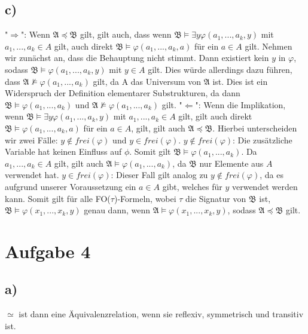 \documentclass[11pt, a4paper]{article}
\begin{document}
\subsection*{c)}
"$\Rightarrow$": Wenn $\mathfrak{A} \preceq \mathfrak{B}$ gilt, gilt auch, dass wenn $\mathfrak{B} \vDash \exists y \varphi (a_1,...,a_k,y)$ mit $a_1,...,a_k \in A$ gilt, auch direkt $\mathfrak{B} \vDash \varphi(a_1,...,a_k,a)$ für ein $a\in A$ gilt.\newline
Nehmen wir zunächst an, dass die Behauptung nicht stimmt. Dann existiert kein $y$ in $\varphi$, sodass $\mathfrak{B} \vDash \varphi(a_1,...,a_k,y)$ mit $y\in A$ gilt. Dies würde allerdings dazu führen, dass $\mathfrak{A} \nvDash \varphi(a_1,...,a_k)$ gilt, da A das Universum von $\mathfrak{A}$ ist. Dies ist ein Widerspruch der Definition elementarer Substrukturen, da dann $\mathfrak{B} \vDash \varphi(a_1,...,a_k)$ und $\mathfrak{A} \nvDash \varphi(a_1,...,a_k)$ gilt.\newline\newline
"$\Leftarrow$": Wenn die Implikation, wenn $\mathfrak{B} \vDash \exists y \varphi(a_1,...,a_k,y)$ mit $a_1,...,a_k \in A$ gilt, gilt auch direkt $\mathfrak{B} \vDash \varphi(a_1,...,a_k,a)$ für ein $a\in A$, gilt, gilt auch $\mathfrak{A} \preceq \mathfrak{B}$.\newline
Hierbei unterscheiden wir zwei Fälle: $y\notin frei(\varphi)$ und $y \in frei(\varphi)$.\newline
$y \notin frei(\varphi)$: Die zusätzliche Variable hat keinen Einfluss auf $\phi$. Somit gilt $\mathfrak{B} \vDash \varphi(a_1,...,a_k)$. Da $a_1,...,a_k \in A$ gilt, gilt auch $\mathfrak{A} \vDash \varphi (a_1,...,a_k)$, da $\mathfrak{B}$ nur Elemente aus $A$ verwendet hat.\newline
$y \in frei(\varphi)$: Dieser Fall gilt analog zu $y \notin frei(\varphi)$, da es aufgrund unserer Voraussetzung ein $a \in A$ gibt, welches für $y$ verwendet werden kann. Somit gilt für alle FO($\tau$)-Formeln, wobei $\tau$ die Signatur von $\mathfrak{B}$ ist, $\mathfrak{B} \vDash \varphi(x_1,...,x_k,y)$ genau dann, wenn $\mathfrak{A} \vDash \varphi(x_1,...,x_k,y)$, sodass $\mathfrak{A} \preceq \mathfrak{B}$ gilt.

\section*{Aufgabe 4}
\subsection*{a)}
$\simeq$ ist dann eine Äquivalenzrelation, wenn sie reflexiv, symmetrisch und transitiv ist.
\end{document}
